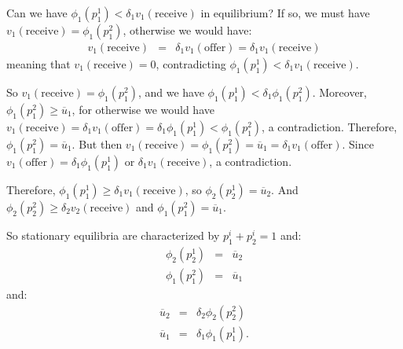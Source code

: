 \documentclass[12pt]{article}
\newcommand{\n}{\noindent}
\newcommand{\s}{\vspace{5mm}}
\begin{document}
\s
\n  Can we have $\phi_1(p_1^1)<\delta_1v_1(\mbox{receive})$ in equilibrium?  If so, we must have $v_1(\mbox{receive})=\phi_1(p_1^2)$, otherwise we would have:
\begin{eqnarray*}
v_1(\mbox{receive})&=&\delta_1v_1(\mbox{offer})=\delta_1v_1(\mbox{receive})
\end{eqnarray*} meaning that $v_1(\mbox{receive})=0$, contradicting $\phi_1(p_1^1)<\delta_1v_1(\mbox{receive})$.

\s
\n  So $v_1(\mbox{receive})=\phi_1(p_1^2)$, and we have $\phi_1(p_1^1)<\delta_1\phi_1(p_1^2)$.  Moreover, $\phi_1(p_1^2)\geq \overline{u}_1$, for otherwise we would have $v_1(\mbox{receive})=\delta_1v_1(\mbox{offer})=\delta_1\phi_1(p_1^1)<\phi_1(p_1^2)$, a contradiction.  Therefore, $\phi_1(p_1^2)=\overline{u}_1$.  But then $v_1(\mbox{receive})=\phi_1(p_1^2)=\overline{u}_1=\delta_1v_1(\mbox{offer})$.  Since $v_1(\mbox{offer})=\delta_1\phi_1(p_1^1)$ or $\delta_1v_1(\mbox{receive})$, a contradiction.

\s
\n  Therefore, $\phi_1(p_1^1)\geq\delta_1v_1(\mbox{receive})$, so $\phi_2(p_2^1)=\overline{u}_2$.  And $\phi_2(p_2^2)\geq\delta_2v_2(\mbox{receive})$ and $\phi_1(p_1^2)=\overline{u}_1$.

\s
\n So stationary equilibria are characterized by $p_1^i+p_2^i=1$ and:
\begin{eqnarray*}
\phi_2(p_2^1)&=&\overline{u}_2\\
\phi_1(p_1^2)&=&\overline{u}_1
\end{eqnarray*} and:
\begin{eqnarray*}
\overline{u}_2&=&\delta_2\phi_2(p_2^2)\\
\overline{u}_1&=&\delta_1\phi_1(p_1^1).
\end{eqnarray*}
\end{document}
